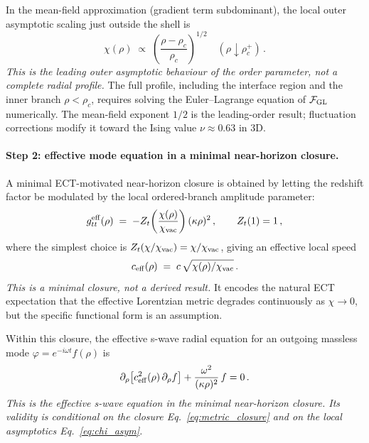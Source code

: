 \documentclass[11pt,a4paper]{article}
\numberwithin{equation}{section}
\begin{document}
In the mean-field approximation (gradient term subdominant), the local outer
asymptotic scaling just outside the shell is
\begin{equation}
\chi(\rho)
\;\propto\;
\left(\frac{\rho - \rho_c}{\rho_c}\right)^{1/2}
\quad (\rho \downarrow \rho_c^+)\,.
\label{eq:chi_asym}
\end{equation}
\textit{This is the leading outer asymptotic behaviour of the order parameter,
not a complete radial profile.}
The full profile, including the interface region and the inner branch
$\rho < \rho_c$, requires solving the Euler--Lagrange equation of
$\mathcal{F}_{\rm GL}$ numerically.
The mean-field exponent $1/2$ is the leading-order result; fluctuation
corrections modify it toward the Ising value $\nu\approx0.63$ in 3D.

\paragraph{Step 2: effective mode equation in a minimal near-horizon closure.}

A minimal ECT-motivated near-horizon closure is obtained by letting the
redshift factor be modulated by the local ordered-branch amplitude parameter:
\begin{equation}
g_{tt}^{\rm eff}(\rho)
\;=\;
-Z_t\!\left(\frac{\chi(\rho)}{\chi_{\rm vac}}\right)(\kappa\rho)^2\,,
\qquad
Z_t(1) = 1\,,
\label{eq:metric_closure}
\end{equation}
where the simplest choice is $Z_t(\chi/\chi_{\rm vac}) = \chi/\chi_{\rm vac}$,
giving an effective local speed
\begin{equation}
c_{\rm eff}(\rho)
\;=\;
c\,\sqrt{\chi(\rho)/\chi_{\rm vac}}\,.
\label{eq:ceff2}
\end{equation}
\textit{This is a minimal closure, not a derived result.}
It encodes the natural ECT expectation that the effective Lorentzian metric
degrades continuously as $\chi\to0$, but the specific functional form is an
assumption.

Within this closure, the effective s-wave radial equation for an outgoing
massless mode $\varphi = e^{-i\omega t}f(\rho)$ is
\begin{equation}
\partial_\rho
\!\left[
c_{\rm eff}^2(\rho)\,\partial_\rho f
\right]
+
\frac{\omega^2}{(\kappa\rho)^2}\,f
=
0\,.
\label{eq:wave_eq2}
\end{equation}
\textit{This is the effective s-wave equation in the minimal near-horizon
closure.
Its validity is conditional on the closure Eq.~\eqref{eq:metric_closure}
and on the local asymptotics Eq.~\eqref{eq:chi_asym}.}
\end{document}
